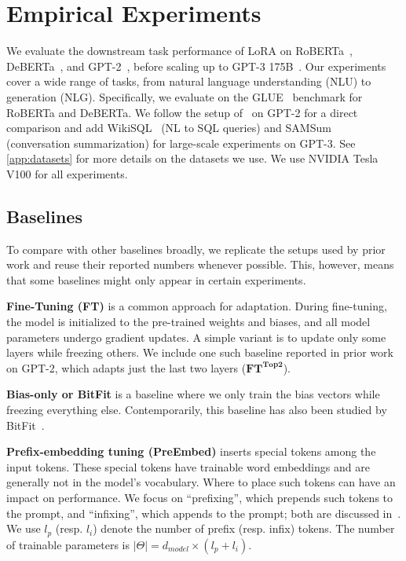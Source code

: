 \section{Empirical Experiments}
\label{sec:empirical}
We evaluate the downstream task performance of LoRA on RoBERTa~\citep{liu2019roberta}, DeBERTa~\citep{he2021deberta}, and GPT-2~\citep{radford_language_nodate}, before scaling up to GPT-3 175B~\citep{brown_language_2020}.
Our experiments cover a wide range of tasks, from natural language understanding (NLU) to generation (NLG).
Specifically, we evaluate on the GLUE~\citep{wang2019glue} benchmark for RoBERTa and DeBERTa.
We follow the setup of~\citet{li_prefix-tuning_2021} on GPT-2 for a direct comparison and add WikiSQL~\citep{DBLP:journals/corr/abs-1709-00103} (NL to SQL queries) and SAMSum~\citep{DBLP:journals/corr/abs-1911-12237} (conversation summarization) for large-scale experiments on GPT-3.
See \autoref{app:datasets} for more details on the datasets we use.
We use NVIDIA Tesla V100 for all experiments.

\subsection{Baselines}
\label{sec:expt_baselines}
To compare with other baselines broadly, we replicate the setups used by prior work and reuse their reported numbers whenever possible.
This, however, means that some baselines might only appear in certain experiments.

\textbf{Fine-Tuning (FT)} is a common approach for adaptation.
During fine-tuning, the model is initialized to the pre-trained weights and biases, and all model parameters undergo gradient updates.%
A simple variant is to update only some layers while freezing others.
We include one such baseline reported in prior work~\citep{li_prefix-tuning_2021} on GPT-2, which adapts just the last two layers ($\textbf{FT}^{\textbf{Top2}}$).

\textbf{Bias-only or BitFit} is a baseline where we only train the bias vectors while freezing everything else.
Contemporarily, this baseline has also been studied by BitFit~\citep{zaken2021bitfit}.

\textbf{Prefix-embedding tuning (PreEmbed)} inserts special tokens among the input tokens.
These special tokens have trainable word embeddings and are generally not in the model's vocabulary.
Where to place such tokens can have an impact on performance.
We focus on ``prefixing'', which prepends such tokens to the prompt, and ``infixing'', which appends to the prompt; both are discussed in~\citet{li_prefix-tuning_2021}.
We use $l_{p}$ (resp. $l_{i}$) denote the number of prefix (resp. infix) tokens.
The number of trainable parameters is $|\Theta| = d_{model} \times (l_p + l_i)$.


